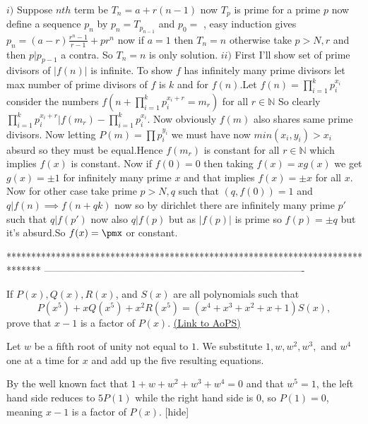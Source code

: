 \begin{solution}
	$i)$ Suppose $nth$ term be $T_n=a+r(n-1)$ now $T_p$ is prime for a prime $p$ now define a sequence $p_n$ by $p_n=T_{p_{n-1}}$ and $p_0=$ , easy induction gives $p_n=(a-r)\frac {r^n-1}{r-1}+pr^n$ now if $a=1$ then $T_n=n$ otherwise take $p>N,r$ and then $p|p_{p-1}$ a contra. So $T_n=n$ is only solution.
$ii)$ First I'll show set of prime divisors of $|f(n)|$ is infinite. To show $f$ has infinitely many prime divisors let max number of prime divisors of $f$ is $k$ and for $f(n)$.Let $f(n)=\prod_{i=1}^{k} p_i^{x_i}$ consider the numbers $f(n+\prod_{i=1}^{k} p_i^{x_i+r}=m_r)$ for all $r\in\mathbb N$ So clearly $\prod_{i=1}^{k} p_i^{x_i+r}|f(m_r)-\prod_{i=1}^{k} p_i^{x_i}$. Now obviously $f(m)$ also shares same prime divisors. Now letting $P(m)=\prod p_i^{y_i}$ we must have now $min(x_i,y_i)> x_i$ absurd so they must be equal.Hence $f(m_r)$ is constant for all $r\in\mathbb N$ which implies $f(x)$ is constant. Now if $f(0)=0$ then taking $f(x)=xg(x)$ we get $g(x)=\pm 1$ for infinitely many prime $x$ and that implies $f(x)=\pm x$ for all $x$. Now for other case take prime $p>N,q$ such that $(q,f(0))=1$ and $q|f(n)\implies f(n+qk)$ now so by dirichlet there are infinitely many prime $p'$ such that $q|f(p')$ now also $q|f(p)$ but as $|f(p)|$ is prime so $f(p)=\pm q$ but it's absurd.So $f(x)=\pmx$ or constant.
\end{solution}
*******************************************************************************
-------------------------------------------------------------------------------

\begin{problem}
	If $ P(x),Q(x),R(x)$, and $ S(x)$ are all polynomials such that \[ P(x^5)+xQ(x^5)+x^2R(x^5)=(x^4+x^3+x^2+x+1)S(x),\] prove that $ x-1$ is a factor of $ P(x)$.
	\flushright \href{https://artofproblemsolving.com/community/c6h342993}{(Link to AoPS)}
\end{problem}



\begin{solution} Let $ w$ be a fifth root of unity not equal to $ 1$. We substitute $ 1, w, w^2, w^3,$ and $ w^4$ one at a time for $ x$ and add up the five resulting equations.

By the well known fact that $ 1+w+w^2+w^3+w^4=0$ and that $ w^5=1$, the left hand side reduces to $ 5P(1)$ while the right hand side is $ 0$, so $ P(1)=0$, meaning $ x-1$ is a factor of $ P(x)$. [\/hide]
\end{solution}



